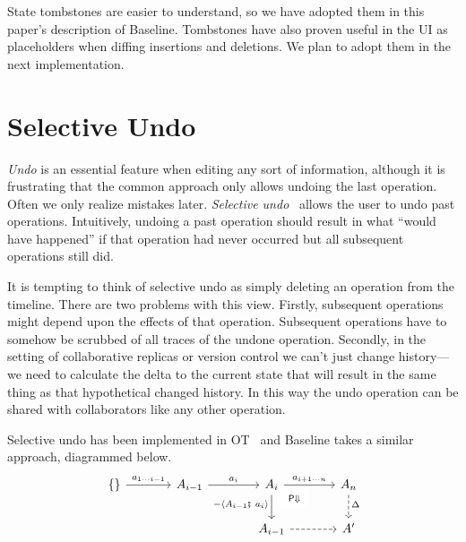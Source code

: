 \documentclass[english,submission]{programming}
\theoremstyle{definition}
\begin{document}
State tombstones are easier to understand, so we have adopted them in this paper's description of Baseline. Tombstones have also proven useful in the UI as placeholders when diffing insertions and deletions. We plan to adopt them in the next implementation.



\section{Selective Undo}\label{undo}

\textit{Undo} is an essential feature when editing any sort of information, although it is frustrating that the common approach only allows undoing the last operation. Often we only realize mistakes later. \textit{Selective undo}~\cite{berlage94} allows the user to undo past operations. Intuitively, undoing a past operation should result in what ``would have happened'' if that operation had never occurred but all subsequent operations still did.

It is tempting to think of selective undo as simply deleting an operation from the timeline. There are two problems with this view. Firstly, subsequent operations might depend upon the effects of that operation. Subsequent operations have to somehow be scrubbed of all traces of the undone operation. Secondly, in the setting of collaborative replicas or version control we can't just change history---we need to calculate the delta to the current state that will result in the same thing as that hypothetical changed history. In this way the undo operation can be shared with collaborators like any other operation.

Selective undo has been implemented in OT~\cite{sun00, weiss08} and Baseline takes a similar approach, diagrammed below.
\[\begin{tikzcd}[column sep=large]
	{\{\}} & {A_{i-1}} & {A_i} & {A_n} \\
	&& {A_{i-1}} & {A'}
	\arrow["{{{a_{1 \cdots i-1}}}}", from=1-1, to=1-2]
	\arrow["{{{a_i}}}", from=1-2, to=1-3]
	\arrow["{{{a_{i+1 \cdots n}}}}", from=1-3, to=1-4]
	\arrow["{{{- \langle A_{i-1}\fatsemi\  a_i \rangle}}}"'{pos=0.4}, from=1-3, to=2-3]
	\arrow["{{\begin{array}{c} \textsf{P}\Downarrow \end{array}}}"{description, pos=0.2}, draw=none, from=1-3, to=2-4]
	\arrow["{{{\Delta}}}"{pos=0.4}, dashed, from=1-4, to=2-4]
	\arrow[dashed, from=2-3, to=2-4]
\end{tikzcd}\]
\end{document}
